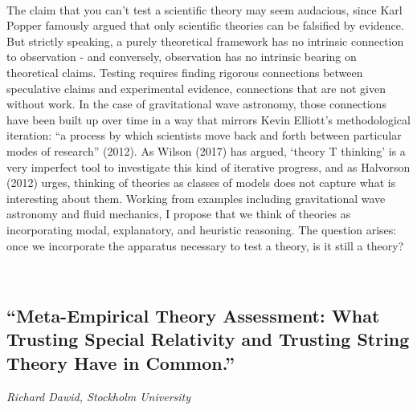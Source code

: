 \documentclass[11pt]{article}
\begin{document}
\ 

The claim that you can’t test a scientific theory may seem audacious, since Karl Popper famously argued that only scientific theories can be falsified by evidence.  But strictly speaking, a purely theoretical framework has no intrinsic connection to observation - and conversely, observation has no intrinsic bearing on theoretical claims. Testing requires finding rigorous connections between speculative claims and experimental evidence, connections that are not given without work. In the case of gravitational wave astronomy, those connections have been built up over time in a way that mirrors Kevin Elliott’s methodological iteration: ``a process by which scientists move back and forth between particular modes of research'' (2012). As Wilson (2017) has argued, ‘theory T thinking’ is a very imperfect tool to investigate this kind of iterative progress, and as Halvorson (2012) urges, thinking of theories as classes of models does not capture what is interesting about them. Working from examples including gravitational wave astronomy and fluid mechanics, I propose that we think of theories as incorporating modal, explanatory, and heuristic reasoning. The question arises: once we incorporate the apparatus necessary to test a theory, is it still a theory?

\ 

\subsection*{\textsf{``Meta-Empirical Theory
Assessment: What Trusting
Special Relativity and Trusting
String Theory Have in Common.''}}

\textcolor{moderncvgreen}{
\textit{Richard Dawid, Stockholm University
}
}

\ 
\end{document}
